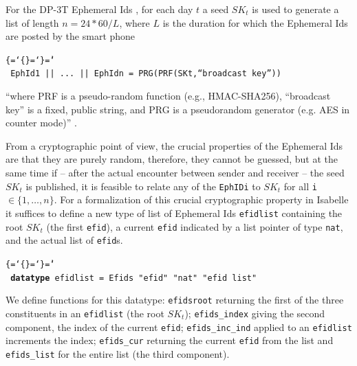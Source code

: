 \documentclass{llncs}
\newenvironment{ttbox}{\begin{alltt}\ttbraces\small\tt}%
                      {\end{alltt}}
\def\ttbraces{\let\.=\nobreak\chardef\{=`\{\chardef\}=`\}\chardef\|=`\\}
\begin{document}
For the DP-3T Ephemeral Ids \cite{dp3t:wp}, for each day $t$ a seed $SK_t$
is used to generate a list of length $n = 24 * 60 / L$, where $L$ is the duration for which
the Ephemeral Ids are posted by the smart phone
\begin{ttbox}
  EphId1 || ... || EphIdn = PRG(PRF(SKt,``broadcast key''))
\end{ttbox} 
``where PRF is a pseudo-random function (e.g., HMAC-SHA256), ``broadcast key'' is a
fixed, public string, and PRG is a pseudorandom generator (e.g. AES in counter mode)'' \cite{dp3t:wp}.

From a cryptographic point of view, the crucial properties of the Ephemeral Ids are that
they are purely random, therefore, they cannot be guessed, but at the same time if -- after
the actual encounter between sender and receiver -- the seed $SK_t$ is published, it is feasible
to relate any of the \texttt{EphIDi} to $SK_t$  for all \texttt{i} $\in \{1, \ldots, n\}$.
For a formalization of this crucial cryptographic property in Isabelle it suffices to define a new type
of list of Ephemeral Ids \texttt{efidlist} containing the root $SK_t$ (the first \texttt{efid}),
a current \texttt{efid} indicated by a list pointer of type \texttt{nat}, and the actual list of
\texttt{efid}s.
\begin{ttbox}
{\bf{datatype}} efidlist = Efids "efid" "nat" "efid list"
\end{ttbox}
We define functions for this datatype: \texttt{efidsroot} returning the first of the three
constituents in an \texttt{efidlist} (the root $SK_t$); \texttt{efids\_index} giving the second
component, the index of the current \texttt{efid}; \texttt{efids\_inc\_ind} applied to an
\texttt{efidlist} increments the index; \texttt{efids\_cur} returning the current \texttt{efid}
from the list and \texttt{efids\_list} for the entire list (the third component).
\end{document}
